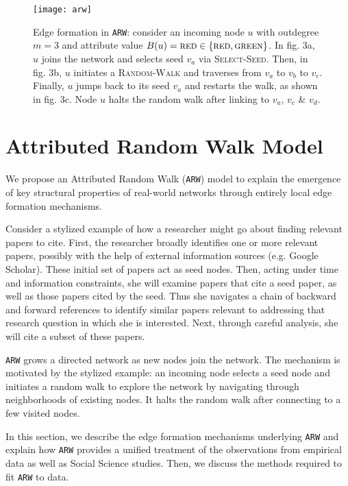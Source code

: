 \begin{figure*}
	\vspace{-20pt}
    \centering
    \texttt{[image: arw]}
    \caption{Edge formation in \texttt{ARW}: consider
    an incoming node $u$ with outdegree ${m=3}$ and attribute value {$B(u)=\textsc{red} \in \{\textsc{red},\textsc{green}\}$}.
    In fig. 3a, $u$ joins the network and selects seed $v_a$ via \textsc{Select-Seed}.
    Then, in fig. 3b, $u$ initiates a \textsc{Random-Walk} and traverses from $v_a$ to $v_b$ to $v_c$.
    Finally, $u$ jumps back to its seed $v_a$ and restarts the walk, as shown in fig. 3c.
    Node $u$ halts the random walk after linking to $v_a$, $v_c$ \& $v_d$.
    }
    \label{fig:randomwalk}
	\vspace{-8pt}
\end{figure*}

\section{Attributed Random Walk Model}
\label{sec:Proposed Model}
We propose an Attributed Random Walk (\texttt{ARW}) model to explain the emergence
of key structural properties of real-world networks through {entirely local}
edge formation mechanisms.

Consider a stylized example of how a researcher might go about finding relevant
papers to cite. First, the researcher broadly identifies one or more {relevant}
papers, possibly with the help of external information sources (e.g. Google
Scholar). These initial set of papers act as seed nodes.  Then, acting under
time and information constraints, she will examine papers that cite a seed
paper, as well as those papers cited by the seed. Thus she navigates a chain of
backward and forward references to identify {similar} papers relevant to
addressing that research question in which she is interested. Next, through
careful analysis, she will cite a subset of these papers.

\texttt{ARW} grows a directed network as new nodes join the network. The
mechanism is motivated by the stylized example: an incoming node selects a seed
node and initiates a random walk to explore the network by navigating through
neighborhoods of existing nodes. It halts the random walk after connecting to a
few visited nodes.

In this section, we describe the edge formation mechanisms underlying
\texttt{ARW} and explain how \texttt{ARW} provides a unified treatment of
the observations from empirical data as well as Social Science studies. Then,
we discuss the methods required to fit \texttt{ARW} to data.



